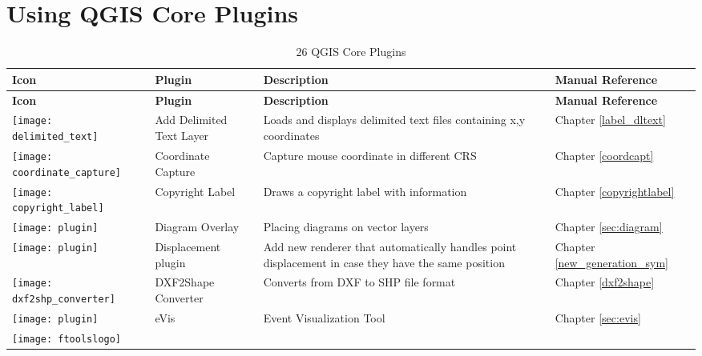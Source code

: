 
\chapter{Using QGIS Core Plugins}\label{sec:core_plugins}


{\setlength{\extrarowheight}{15pt}
\small
\begin{longtable}{|p{1.2cm}|p{3.8cm}|p{7.5cm}|p{3cm}|}
\caption{26 QGIS Core Plugins}\label{tab:core_plugins} \\
\hline
 \textbf{Icon} & \textbf{Plugin} & \textbf{Description} & \textbf{Manual Reference}\\
\endfirsthead
\hline
\textbf{Icon} & \textbf{Plugin} & \textbf{Description} & \textbf{Manual Reference}\\
\endhead
\hline
\texttt{[image: delimited\_text]}
 & Add Delimited Text Layer \index{plugins!delimited text} & Loads and displays delimited text files containing x,y coordinates & Chapter \ref{label_dltext}\\
\hline
\texttt{[image: coordinate\_capture]}
 & Coordinate Capture \index{plugins!coordinate capture}& Capture mouse coordinate in different CRS & Chapter \ref{coordcapt}\\
\hline 
\texttt{[image: copyright\_label]}
 & Copyright Label \index{plugins!copyright}& Draws a copyright label with information & Chapter \ref{copyrightlabel}\\
\hline
\texttt{[image: plugin]}
 & Diagram Overlay \index{plugins!diagram}& Placing diagrams on vector layers & Chapter \ref{sec:diagram}\\
\hline
\texttt{[image: plugin]}
 & Displacement plugin \index{plugins!point displacement}& Add new renderer that automatically handles point displacement in case they have the same position & Chapter \ref{new_generation_sym}\\
\hline
\texttt{[image: dxf2shp\_converter]}
 & DXF2Shape Converter \index{plugins!DXF2Shape}& Converts from DXF to SHP file format & Chapter \ref{dxf2shape}\\
\hline
\texttt{[image: plugin]}
 & eVis & Event Visualization Tool & Chapter \ref{sec:evis}\\
\hline
\texttt{[image: ftoolslogo]}

\end{longtable}}
